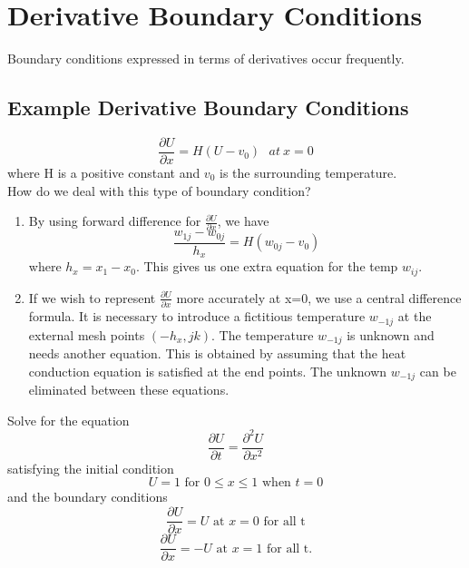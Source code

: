 \section{Derivative Boundary Conditions}
Boundary conditions expressed in terms of derivatives occur frequently.
\subsection{Example Derivative Boundary Conditions}
\[
\frac{\partial U}{\partial x} = H(U-v_0) \ \ \ at \ x=0\]
where H is a positive constant and $v_0$ is the surrounding temperature.\\

How do we deal with this type of boundary condition?\\

\begin{enumerate}
\item
By using forward difference for $\frac{\partial U}{\partial x}$, we have
\[
\frac{w_{1j}-w_{0j}}{h_x} = H(w_{0j}-v_0)\]
where $h_x=x_1-x_0$.  This gives us one extra equation for the temp $w_{ij}$.\\
\item
If we wish to represent $\frac{\partial U}{\partial x}$ more accurately at x=0, we use a central difference formula.  It is necessary to introduce a fictitious
temperature $w_{-1j}$ at the external mesh points $(-h_x,jk)$.  The temperature $w_{-1j}$ is unknown and needs another equation.  This is obtained by assuming that the heat 
conduction equation is satisfied at the end points.  The unknown $w_{-1j}$ can be 
eliminated between these equations.\\
\end{enumerate}
Solve for the equation
\[\frac{\partial U}{\partial t} =\frac{\partial^2 U}{\partial x^2} \]
satisfying the initial condition
\[U=1 \mbox{ for } 0\leq x \leq 1 \mbox{ when } t=0 \]
and the boundary conditions
\[\frac{\partial U}{\partial x} = U \mbox{ at } x=0 \mbox{ for all t} \]
\[\frac{\partial U}{\partial x} = -U \mbox{ at } x=1 \mbox{ for all t}. \]
